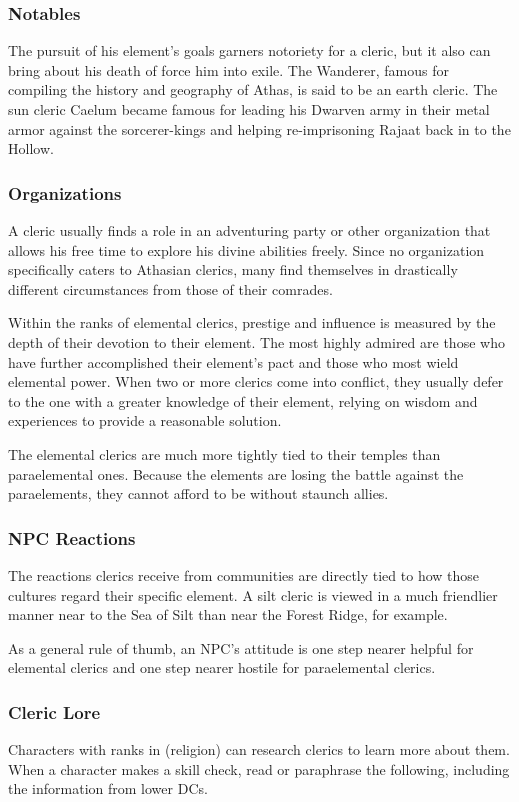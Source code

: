 \subsubsection{Notables}
The pursuit of his element's goals garners notoriety for a cleric, but it also can bring about his death of force him into exile. The Wanderer, famous for compiling the history and geography of Athas, is said to be an earth cleric. The sun cleric Caelum became famous for leading his Dwarven army in their metal armor against the sorcerer-kings and helping re-imprisoning Rajaat back in to the Hollow.

\subsubsection{Organizations}
A cleric usually finds a role in an adventuring party or other organization that allows his free time to explore his divine abilities freely. Since no organization specifically caters to Athasian clerics, many find themselves in drastically different circumstances from those of their comrades.

Within the ranks of elemental clerics, prestige and influence is measured by the depth of their devotion to their element. The most highly admired are those who have further accomplished their element's pact and those who most wield elemental power. When two or more clerics come into conflict, they usually defer to the one with a greater knowledge of their element, relying on wisdom and experiences to provide a reasonable solution.

The elemental clerics are much more tightly tied to their temples than paraelemental ones. Because the elements are losing the battle against the paraelements, they cannot afford to be without staunch allies.

\subsubsection{NPC Reactions}
The reactions clerics receive from communities are directly tied to how those cultures regard their specific element. A silt cleric is viewed in a much friendlier manner near to the Sea of Silt than near the Forest Ridge, for example.

As a general rule of thumb, an NPC's attitude is one step nearer helpful for elemental clerics and one step nearer hostile for paraelemental clerics.

\subsubsection{Cleric Lore}
Characters with ranks in  (religion) can research clerics to learn more about them. When a character makes a skill check, read or paraphrase the following, including the information from lower DCs.

